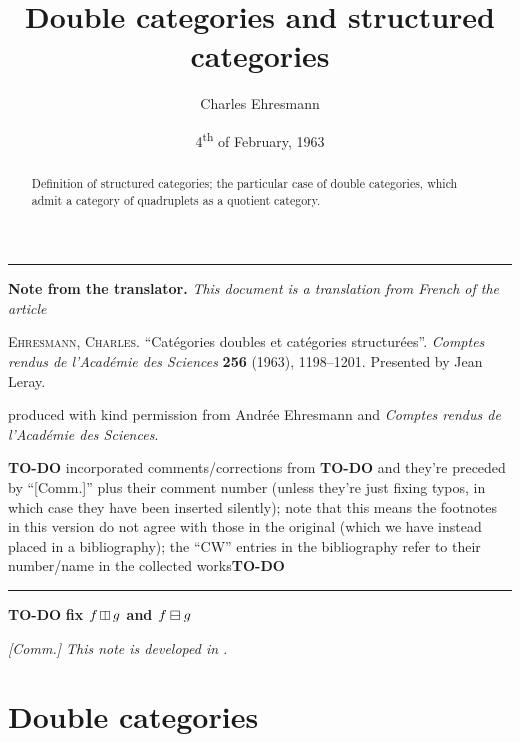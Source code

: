 \documentclass{article}
\title{Double categories and structured categories}
\author{Charles Ehresmann}
\date{4\textsuperscript{th} of February, 1963}
\newcommand{\origcit}{%
  \textsc{Ehresmann, Charles.}
  ``Catégories doubles et catégories structurées''.
  \emph{Comptes rendus de l'Académie des Sciences} \textbf{256} (1963), 1198--1201.
  Presented by Jean Leray.
}
\newenvironment{itenv}[1]
  {\phantomsection\par\medskip\noindent\textbf{#1.}\itshape}
  {\par\medskip}
\newcommand{\oldpage}[1]{\marginpar{\footnotesize$\Big\vert$ \textit{p.~#1}}}
\newcommand{\todo}{{\color{purple}\textbf{TO-DO }}}
\newcommand{\unsure}[1]{{\color{purple}\textbf{#1}}}
\newcommand{\vmult}{\mathbin{\raisebox{-.1em}{\rotatebox{90}{$\boxminus$}}}}
\newcommand{\hmult}{\mathbin{\raisebox{-.05em}{$\boxminus$}}}
\begin{document}
\maketitle

\hrule
\begin{itenv}{Note from the translator}
This document is a translation from French of the article

\medskip
{\normalfont\origcit}

\medskip
{\noindent}produced with kind permission from Andrée Ehresmann and \emph{Comptes rendus de l'Académie des Sciences}.

\medskip

\todo incorporated comments/corrections from \todo and they're preceded by ``[Comm.]'' plus their comment number (unless they're just fixing typos, in which case they have been inserted silently); note that this means the footnotes in this version do not agree with those in the original (which we have instead placed in a bibliography); the ``CW'' entries in the bibliography refer to their number/name in the collected works\todo

\end{itenv}
\hrule

\begin{abstract}
  Definition of structured categories; the particular case of double categories, which admit a category of quadruplets as a quotient category.
\end{abstract}


\todo \unsure{fix $f\vmult g$ and $f\hmult g$}

\emph{[Comm.] This note is developed in \cite{CW63}.}

\section{Double categories}
\oldpage{1198}
\end{document}
